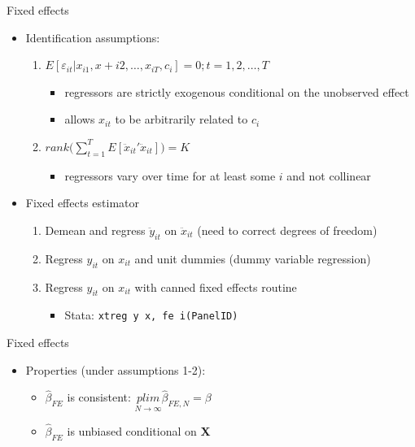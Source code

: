 \documentclass{beamer}
\begin{document}
\begin{frame}{Fixed effects}
	
	\begin{itemize}
	\item Identification assumptions:	
		\begin{enumerate}
		\item $E[\varepsilon_{it} | x_{i1}, x+{i2}, \dots, x_{iT}, c_i]=0; t=1,2,\dots,T$
			\begin{itemize}
			\item regressors are strictly exogenous conditional on the unobserved effect
			\item allows $x_{it}$ to be arbitrarily related to $c_i$
			\end{itemize}
		\item $rank\bigg( \sum_{t=1}^T E[\ddot{x}_{it}'\ddot{x}_{it}]\bigg) = K$
			\begin{itemize}
			\item regressors vary over time for at least some $i$ and not collinear
			\end{itemize}
		\end{enumerate}
	\item Fixed effects estimator
		\begin{enumerate}
		\item Demean and regress $\ddot{y}_{it}$ on $\ddot{x}_{it}$ (need to correct degrees of freedom)
		\item Regress $y_{it}$ on $x_{it}$ and unit dummies (dummy variable regression)
		\item Regress $y_{it}$ on $x_{it}$ with canned fixed effects routine
			\begin{itemize}
			\item Stata: \texttt{xtreg y x, fe i(PanelID)}
			\end{itemize}
		\end{enumerate}
	\end{itemize}
\end{frame}


\begin{frame}{Fixed effects}

\begin{itemize}
	\item Properties (under assumptions 1-2):
		\begin{itemize}
		\item $\widehat{\beta}_{FE}$ is consistent: $\underset{N\rightarrow \infty}{plim} \widehat{\beta}_{FE,N}=\beta$
		\item $\widehat{\beta}_{FE}$ is unbiased conditional on \textbf{X}
		\end{itemize}
\end{itemize}

\end{frame}
\end{document}
